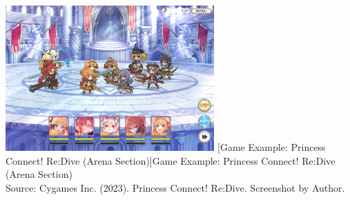 \documentclass[12pt,oneside,openright,a4paper]{cpe-english-project}
\begin{document}
\begin{enumerate}
	\begin{minipage}[c]{\textwidth}\centering
	\includegraphics[width=8cm]{figure/related-work-princon-arena.png}
	[Game Example: Princess Connect! Re:Dive (Arena Section)]{Game Example: Princess Connect! Re:Dive (Arena Section)
		\\ Source: Cygames Inc. (2023). Princess Connect! Re:Dive. Screenshot by Author.}
	\label{fig:related-work-princon-arena}
	\end{minipage}


\end{enumerate}
\end{document}
